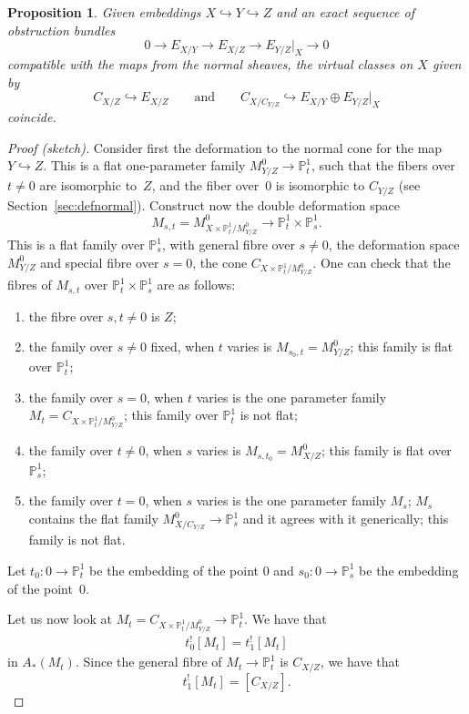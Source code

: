 \documentclass[pdftex]{sigma}
\numberwithin{equation}{section}
\newtheorem{Proposition}[Theorem]{Proposition}
 { \theoremstyle{definition}
\newtheorem{Definition}[Theorem]{Definition}
\newtheorem{Note}[Theorem]{Note}
\newtheorem{Example}[Theorem]{Example}
\newtheorem{Remark}[Theorem]{Remark}
\newtheorem{notation}[Theorem]{Notation}
\newtheorem{construction}[Theorem]{Construction}
}
\newcommand{\PP}{\mathbb P}
\theoremstyle{plain}
\theoremstyle{definition}
\theoremstyle{remark}
\begin{document}
\begin{Proposition}\label{easycompat}
Given embeddings $X\hookrightarrow Y\hookrightarrow Z$ and an exact sequence of obstruction bundles
\[0\to E_{X/Y}\to E_{X/Z}\to E_{Y/Z}\rvert_X\to 0\]
compatible with the maps from the normal sheaves,
the virtual classes on $X$ given by
\[C_{X/Z}\hookrightarrow E_{X/Z}\qquad\text{and}\qquad C_{X/C_{Y/Z}}\hookrightarrow E_{X/Y}\oplus E_{Y/Z}\rvert_X\]
coincide.
\end{Proposition}
\begin{proof}[Proof (sketch)]
Consider first the deformation to the normal cone for the map $Y\hookrightarrow Z$. This is a flat one-parameter family $M^0_{Y/Z}\to\PP_{ t}^1$, such that the fibers over $t\neq 0$ are isomorphic to~$Z$, and the fiber over~$0$ is isomorphic to $C_{Y/Z}$ (see Section~\ref{sec:defnormal}).
Construct now the double deformation space
\[
M_{s,t}=M^0_{{X\times\PP^1_t}/M^0_{Y/Z}}\to \PP^1_t\times \PP^1_s.
\]
This is a flat family over $\PP^1_s$, with general fibre over $s\neq 0$, the deformation space $M^0_{Y/Z}$ and special fibre over $s=0$, the cone $C_{X\times \PP^1_t/M^0_{Y/Z}}$. One can check that the fibres of $M_{s,t}$ over $ \PP^1_t\times \PP^1_s$ are as follows:
\begin{enumerate}\itemsep=0pt
\item[1)] the fibre over $s,t\neq 0$ is $Z$;
\item[2)] the family over $s\neq 0$ fixed, when $t$ varies is $M_{s_0,t}=M^0_{Y/Z}$; this family is flat over $\PP^1_t$;
\item[3)] the family over $s=0$, when $t$ varies is the one parameter family $M_{t}=C_{X\times \PP^1_t/M^0_{Y/Z}}$; this family over $\PP^1_t$ is not flat;
\item[4)] the family over $t\neq 0$, when $s$ varies is $M_{s,t_0}=M^0_{X/Z}$; this family is flat over $\PP^1_s$;
\item[5)] the family over $t=0$, when $s$ varies is the one parameter family $M_{s}$; $M_s$ contains the flat family $M^0_{X/C_{Y/Z}}\to \PP^1_s$ and it agrees with it generically; this family is not flat.
\end{enumerate}
Let $t_0\colon 0\to \PP^1_t$ be the embedding of the point $0$ and $s_0\colon 0\to \PP^1_s$ be the embedding of the point~$0$.

Let us now look at $M_t=C_{X\times \PP^1_t/M^0_{Y/Z}}\to \PP^1_t$. We have that
\begin{gather*}t_0^![M_t]=t_1^![M_t]
\end{gather*}
in $A_*(M_t)$. Since the general fibre of $M_t\to\PP^1_t$ is $C_{X/Z}$, we have that
\begin{equation*}%
t^!_1[M_t]=[C_{X/Z}].
\end{equation*}


\end{proof}
\end{document}
